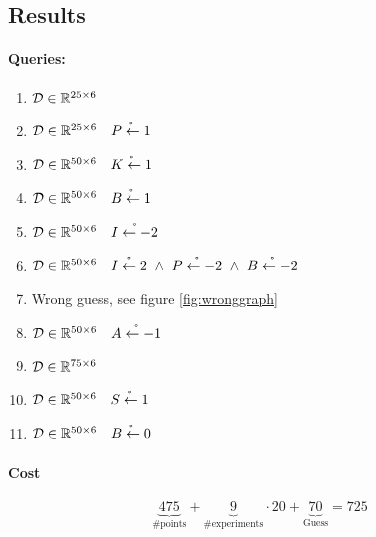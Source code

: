 \documentclass[12pt,fleqn,]{article}
\begin{document}
\begin{multicols}{2}
%



\section{Results}

\paragraph{ Queries:}

\begin{enumerate}[noitemsep]
	\item \(\mathcal D \in \mathbb R^{25\times 6}\)
	\item \(\mathcal D \in \mathbb R^{25\times 6}\quad \mathring{P\leftarrow1}\) 
	\item \(\mathcal D \in \mathbb R^{50\times 6}\quad \mathring{K\leftarrow1}\) 
	\item \(\mathcal D \in \mathbb R^{50\times 6}\quad \mathring{B\leftarrow1}\) 
	\item \(\mathcal D \in \mathbb R^{50\times 6}\quad \mathring{I\leftarrow-2}\) 
	\item \(\mathcal D \in \RR^{50\times 6}\quad \mathring{I\leftarrow2}\ \wedge\ \mathring{P\leftarrow-2}\ \wedge\ \mathring{B\leftarrow-2}\)
	\item Wrong guess, see figure \ref{fig:wronggraph}

	\item \(\mathcal D \in \mathbb R^{50\times 6}\quad  \mathring{A\leftarrow-1}\) 
	\item \(\mathcal D \in \mathbb R^{75\times 6}\) 
	\item \(\mathcal D \in \mathbb R^{50\times 6}\quad  \mathring{S\leftarrow1}\)
	\item \(\mathcal D \in \mathbb R^{50\times 6}\quad  \mathring{B\leftarrow0}\) 
\end{enumerate}

\paragraph{Cost}
\[
\underbrace{475}_{\text{\# points}} + \underbrace {9}_ {\text{\# experiments}} \cdot 20 +\underbrace{70}_{\text{Guess}}=725
\]


\end{multicols}
\end{document}

